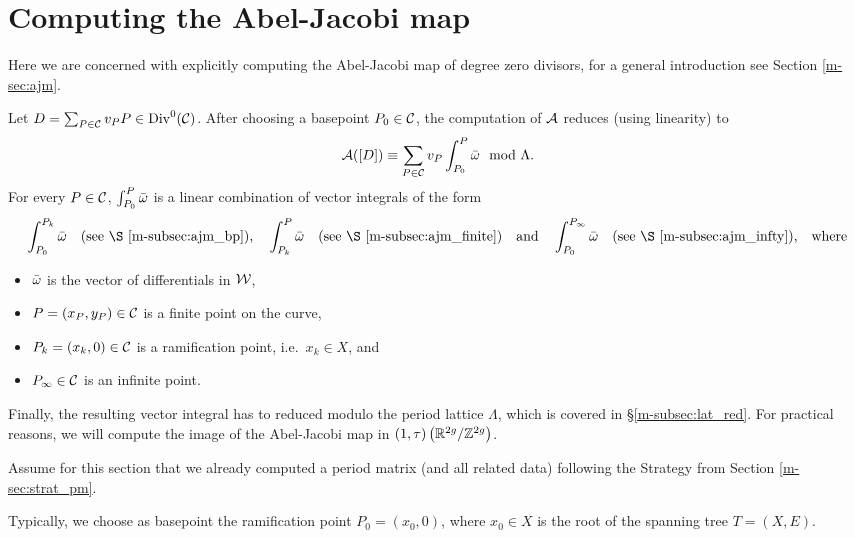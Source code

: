 \documentclass[main.tex]{subfiles}
\begin{document}
  \section{Computing the Abel-Jacobi map}\label{sec:comp_ajm}
  
   Here we are concerned with explicitly computing the Abel-Jacobi map of degree zero divisors, for a general introduction see Section \ref{m-sec:ajm}.
   
   Let $D = \sum_{P \in \mathcal{C}} v_P P \in \operatorname{Div}^0(\mathcal{C})$. After choosing a basepoint $P_0 \in \mathcal{C}$, the computation of $\mathcal{A}$ reduces (using linearity) to
   \begin{equation}
     \mathcal{A}([D]) \equiv \sum_{P \in \mathcal{C}} v_P \int_{P_0}^P \bar{\omega} \mod \Lambda.
   \end{equation}
  For every $P \in \mathcal{C}$, $\int_{P_0}^P \bar{\omega}$ is a linear combination of vector integrals of the form
  \begin{align*}
    \int_{P_0}^{P_k} \bar\w\quad \text{(see \S \ref{m-subsec:ajm_bp}),} \quad
    \int_{P_k}^{P} \bar\w \quad \text{(see \S \ref{m-subsec:ajm_finite})}
    \quad \text{and} \quad \int_{P_0}^{P_{\infty}} \bar\w\quad \text{(see \S \ref{m-subsec:ajm_infty}),} \quad \text{where}
  \end{align*}
  \begin{itemize}
   \item $\bar{\omega}$ is the vector of differentials in $\mathcal{W}$,
   \item $P = (x_P,y_P) \in \mathcal{C}$ is a finite point on the curve,
   \item $P_k = (x_k,0) \in \mathcal{C}$ is a ramification point, i.e.\ $x_k \in X$, and
   \item $P_{\infty} \in \mathcal{C}$ is an infinite point.
  \end{itemize}
  Finally, the resulting vector integral has to reduced modulo the period lattice $\Lambda$, which is covered in \S \ref{m-subsec:lat_red}. For practical reasons, we will compute the
  image of the Abel-Jacobi map in $(1,\tau)\left(\mathbb{R}^{2g} / \mathbb{Z}^{2g}\right)$.
  
  Assume for this section that we already computed a period matrix (and all related data) following the Strategy from Section \ref{m-sec:strat_pm}. 
  
  Typically, we choose as basepoint the ramification point $P_0 = (x_0,0)$, where $x_0 \in X$ is the root of the spanning tree $T = (X,E)$.
\end{document}
